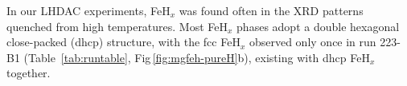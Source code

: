 \documentclass[draft,jgrga,12pt]{agujournal2019}
\begin{document}


In our LHDAC experiments, FeH$_x$ was found often in the XRD patterns quenched from high temperatures.
Most FeH$_x$ phases adopt a double hexagonal close-packed (dhcp) structure, with the fcc FeH$_x$ observed only once in run 223-B1 (Table~\ref{tab:runtable}, Fig\,\ref{fig:mgfeh-pureH}b), existing with dhcp FeH$_x$ together. 




\end{document}
